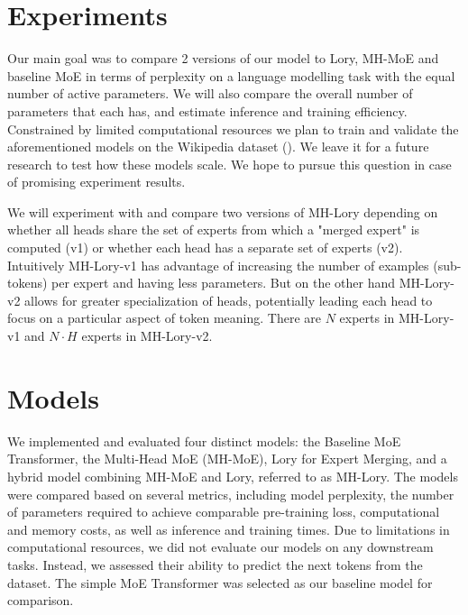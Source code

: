 \documentclass[12pt]{article}
\begin{document}
\section{Experiments}
Our main goal was to compare 2 versions of our model to Lory, MH-MoE and baseline MoE in terms of perplexity on a language modelling task with the equal number of active parameters. We will also compare the overall number of parameters that each has, and estimate inference and training efficiency.
Constrained by limited computational resources we plan to train and validate the aforementioned models on the Wikipedia dataset (\cite{wikidump}). We leave it for a future research to test how these models scale. We hope to pursue this question in case of promising experiment results.

We will experiment with and compare two versions of MH-Lory depending on whether all heads share the set of experts from which a "merged expert" is computed (v1) or whether each head has a separate set of experts (v2). Intuitively MH-Lory-v1 has advantage of increasing the number of examples (sub-tokens) per expert and having less parameters. But on the other hand MH-Lory-v2 allows for greater specialization of heads, potentially leading each head to focus on a particular aspect of token meaning. There are $N$ experts in MH-Lory-v1 and $N \cdot H$ experts in MH-Lory-v2.


\section{Models}

We implemented and evaluated four distinct models: the Baseline MoE Transformer, the Multi-Head MoE (MH-MoE), Lory for Expert Merging, and a hybrid model combining MH-MoE and Lory, referred to as MH-Lory. The models were compared based on several metrics, including model perplexity, the number of parameters required to achieve comparable pre-training loss, computational and memory costs, as well as inference and training times.
Due to limitations in computational resources, we did not evaluate our models on any downstream tasks. Instead, we assessed their ability to predict the next tokens from the dataset. The simple MoE Transformer was selected as our baseline model for comparison.
\end{document}

